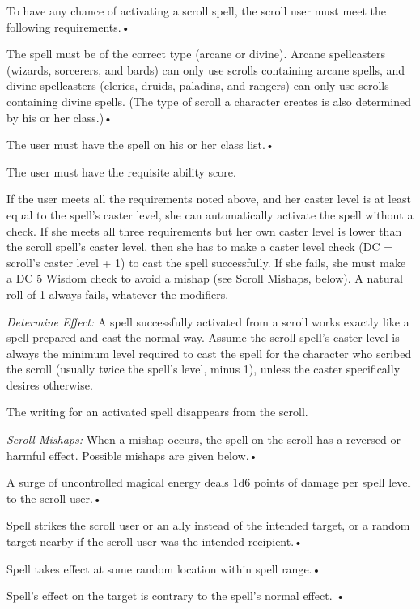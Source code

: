 \documentclass{article}
\begin{document}
To have any chance of activating a scroll spell, the scroll user must meet the 
following requirements.• 

\parindent=3pt
The spell must be of the correct type (arcane or divine). Arcane spellcasters (wizards, 
sorcerers, and bards) can only use scrolls containing arcane spells, and divine 
spellcasters (clerics, druids, paladins, and rangers) can only use scrolls containing 
divine spells. (The type of scroll a character creates is also determined by his 
or her class.)• 

The user must have the spell on his or her class list.• 

\parindent=7pt
The user must have the requisite ability score.

\parindent=0pt
If the user meets all the requirements noted above, and her caster level is at 
least equal to the spell's caster level, she can automatically activate the spell 
without a check. If she meets all three requirements but her own caster level is 
lower than the scroll spell's caster level, then she has to make a caster level 
check (DC = scroll's caster level + 1) to cast the spell successfully. If she fails, 
she must make a DC 5 Wisdom check to avoid a mishap (see Scroll Mishaps, below). 
A natural roll of 1 always fails, whatever the modifiers.

\textit{Determine Effect: }A spell successfully activated from a scroll works exactly 
like a spell prepared and cast the normal way. Assume the scroll spell's caster 
level is always the minimum level required to cast the spell for the character 
who scribed the scroll (usually twice the spell's level, minus 1), unless the caster 
specifically desires otherwise. 

The writing for an activated spell disappears from the scroll.

\textit{Scroll Mishaps: }When a mishap occurs, the spell on the scroll has a reversed 
or harmful effect. Possible mishaps are given below.• 

\parindent=3pt
A surge of uncontrolled magical energy deals 1d6 points of damage per spell level 
to the scroll user.• 

Spell strikes the scroll user or an ally instead of the intended target, or a random 
target nearby if the scroll user was the intended recipient.• 

\parindent=7pt
Spell takes effect at some random location within spell range.• 

\parindent=3pt
Spell's effect on the target is contrary to the spell's normal effect. • 
\end{document}
